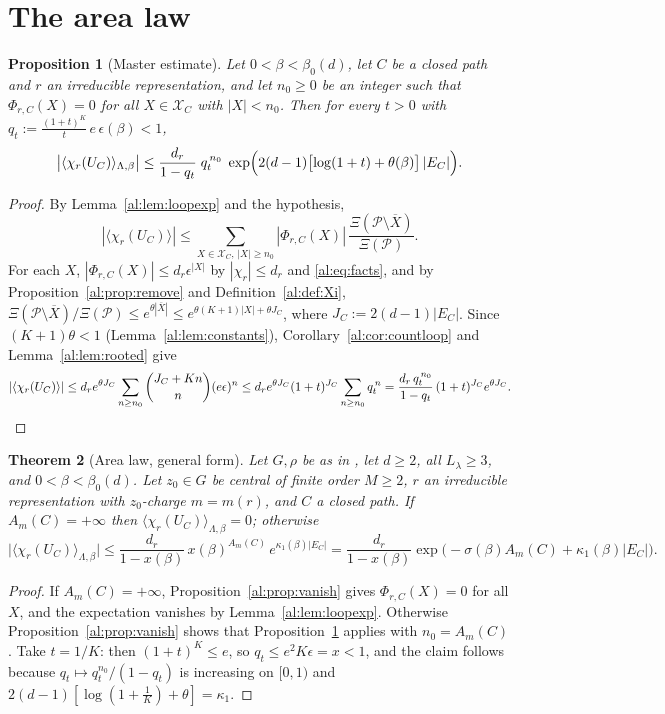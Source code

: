 \documentclass[11pt,a4paper]{article}
\newtheorem{theorem}{Theorem}[section]
\newtheorem{proposition}[theorem]{Proposition}
\theoremstyle{definition}
\theoremstyle{remark}
\newcommand{\cP}{\mathcal{P}}
\newcommand{\cX}{\mathcal{X}}
\newcommand{\Fname}[2]{\cite[#1~`#2']{F}}
\begin{document}
\section{The area law}\label{al:sec:main}

\begin{proposition}[Master estimate]\label{al:prop:master}
Let $0<\beta<\beta_0(d)$, let $C$ be a closed path and $r$ an irreducible representation, and let $n_0\ge0$ be an integer
such that $\Phi_{r,C}(X)=0$ for all $X\in\cX_C$ with $|X|<n_0$. Then for every $t>0$ with
$q_t:=\frac{(1+t)^K}{t}\,e\,\epsilon(\beta)<1$,
\[
\bigl|\langle\chi_r(U_C)\rangle_{\Lambda,\beta}\bigr|\le\frac{d_r}{1-q_t}\;q_t^{\,n_0}\;
\exp\Bigl(2(d-1)\bigl[\log(1+t)+\theta(\beta)\bigr]\,|E_C|\Bigr).
\]
\end{proposition}

\begin{proof}
By Lemma~\ref{al:lem:loopexp} and the hypothesis,
\[
|\langle\chi_r(U_C)\rangle|\le\sum_{X\in\cX_C,\,|X|\ge n_0}|\Phi_{r,C}(X)|\,\frac{\Xi(\cP\setminus\overline X)}{\Xi(\cP)} .
\]
For each $X$, $|\Phi_{r,C}(X)|\le d_r\epsilon^{|X|}$ by $|\chi_r|\le d_r$ and \eqref{al:eq:facts}, and by
Proposition~\ref{al:prop:remove} and Definition~\ref{al:def:Xi},
$\Xi(\cP\setminus\overline X)/\Xi(\cP)\le e^{\theta|\overline X|}\le e^{\theta(K+1)|X|+\theta J_C}$, where
$J_C:=2(d-1)|E_C|$. Since
$(K+1)\theta<1$ (Lemma~\ref{al:lem:constants}), Corollary~\ref{al:cor:countloop} and Lemma~\ref{al:lem:rooted} give
\[
|\langle\chi_r(U_C)\rangle|\le d_re^{\theta J_C}\sum_{n\ge n_0}\binom{J_C+Kn}{n}(e\epsilon)^n
\le d_re^{\theta J_C}(1+t)^{J_C}\sum_{n\ge n_0}q_t^{\,n}=\frac{d_r\,q_t^{\,n_0}}{1-q_t}\,(1+t)^{J_C}e^{\theta J_C}. \qedhere
\]
\end{proof}

\begin{theorem}[Area law, general form]\label{al:thm:general}
Let $G,\rho$ be as in \Fname{Convention}{Group}, let $d\ge2$, all $L_\lambda\ge3$, and $0<\beta<\beta_0(d)$. Let
$z_0\in G$ be central of finite order $M\ge2$, $r$ an irreducible representation with $z_0$-charge $m=m(r)$, and $C$ a
closed path. If $A_m(C)=+\infty$ then $\langle\chi_r(U_C)\rangle_{\Lambda,\beta}=0$; otherwise
\[
\bigl|\langle\chi_r(U_C)\rangle_{\Lambda,\beta}\bigr|\le\frac{d_r}{1-x(\beta)}\,x(\beta)^{A_m(C)}\,e^{\kappa_1(\beta)|E_C|}
=\frac{d_r}{1-x(\beta)}\exp\bigl(-\sigma(\beta)A_m(C)+\kappa_1(\beta)|E_C|\bigr).
\]
\end{theorem}

\begin{proof}
If $A_m(C)=+\infty$, Proposition~\ref{al:prop:vanish} gives $\Phi_{r,C}(X)=0$ for all $X$, and the expectation vanishes by
Lemma~\ref{al:lem:loopexp}. Otherwise Proposition~\ref{al:prop:vanish} shows that Proposition~\ref{al:prop:master} applies
with $n_0=A_m(C)$. Take $t=1/K$: then $(1+t)^K\le e$, so $q_t\le e^2K\epsilon=x<1$, and the claim follows because
$q_t\mapsto q_t^{n_0}/(1-q_t)$ is increasing on $[0,1)$ and $2(d-1)[\log(1+\frac1K)+\theta]=\kappa_1$.
\end{proof}
\end{document}
